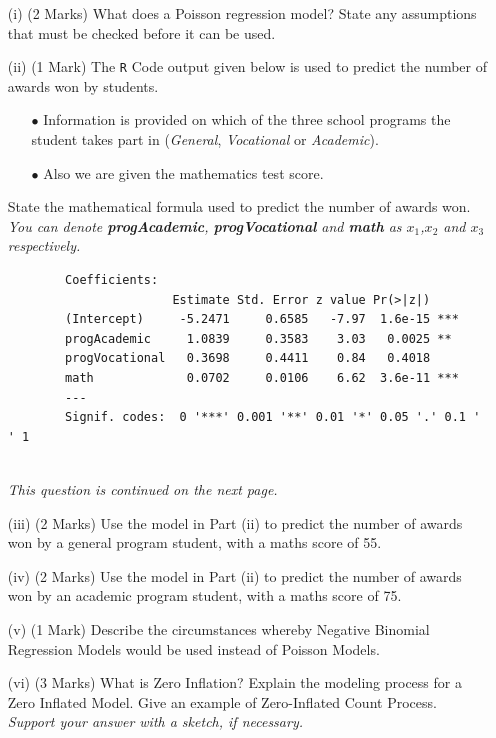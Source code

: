 \documentclass[a4paper,12pt]{article}
\begin{document}
\begin{enumerate}
\begin{enumerate}[(a)]
\begin{itemize}
	\item[(i)] (2 Marks)
	What does a Poisson regression model? State any assumptions that must be checked before it can be used.
	
	\item[(ii)] (1 Mark) The \texttt{R} Code output given below is used to predict the number of awards won by students. \begin{itemize} 
		\item[$\bullet$] Information is provided on which of the three school programs the student takes part in (\textit{General}, \textit{Vocational} or \textit{Academic}). 
		\item[$\bullet$] Also we are given the mathematics test score.
	\end{itemize}
	State the mathematical formula used to predict the number of awards won.\\
	\textit{You can denote \textbf{progAcademic}, \textbf{progVocational} and \textbf{math} as $x_1$,$x_2$ and $x_3$ respectively.}
	
	
	\begin{framed}
		\begin{verbatim}
		Coefficients:
		               Estimate Std. Error z value Pr(>|z|)    
		(Intercept)     -5.2471     0.6585   -7.97  1.6e-15 ***
		progAcademic     1.0839     0.3583    3.03   0.0025 ** 
		progVocational   0.3698     0.4411    0.84   0.4018    
		math             0.0702     0.0106    6.62  3.6e-11 ***
		---
		Signif. codes:  0 '***' 0.001 '**' 0.01 '*' 0.05 '.' 0.1 ' ' 1
		
		\end{verbatim}
	\end{framed}

\noindent \textit{This question is continued on the next page.}
\newpage
	\item[(iii)] (2 Marks) Use the model in Part (ii) to predict the number of awards won by a general program student, with a maths score of 55.
	
	\item[(iv)] (2 Marks) Use the model in Part (ii) to predict the number of awards won by an academic program student, with a maths score of 75.
	
	\item[(v)] (1 Mark) Describe the circumstances whereby Negative Binomial Regression Models would be used instead of Poisson Models.	
	\item[(vi)] (3 Marks)
	What is Zero Inflation? Explain the modeling process for a Zero Inflated Model. Give an example of Zero-Inflated Count Process. \textit{Support your answer with a sketch, if necessary.}
	

\end{itemize}
\end{enumerate}
\end{enumerate}
\end{document}
